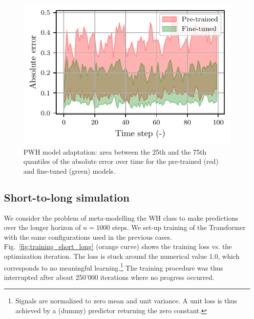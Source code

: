\documentclass{ifacconf}
\begin{document}
\begin{figure}[t]
\centering
\includegraphics[width=.8\linewidth]{img/adaptation/pwh_error_25_75_percentile.pdf}
\caption{PWH model adaptation: area between the 25th and the 75th quantiles of the absolute error over time for the pre-trained (red) and fine-tuned (green) models. }
\label{fig:PWH_model_adaptation_quantiles}   
\end{figure}
\subsection{Short-to-long simulation}
We consider the problem of meta-modelling the WH class to make predictions over the longer horizon of $n=1000$ steps.
We set-up training of the Transformer with the same configurations used in the previous cases. 
Fig.~\ref{fig:training_short_long} (orange curve) shows the training loss vs. the optimization iteration.
The loss is stuck around the numerical value 1.0, which corresponds to no meaningful learning.\footnote{Signals are normalized to zero mean and unit variance. A unit loss is thus achieved by a (dummy) predictor returning the zero constant.} The training procedure was thus interrupted after about 250'000 iterations where no progress occurred. 
\end{document}
